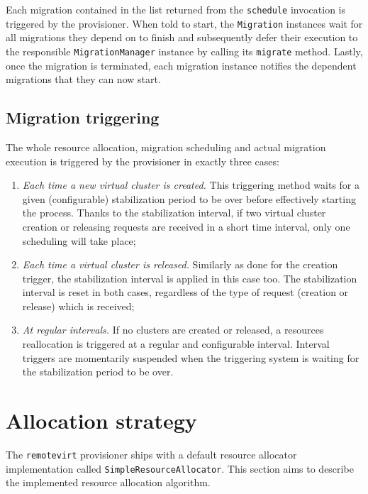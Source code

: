 Each migration contained in the list returned from the \texttt{schedule} invocation is triggered by the provisioner. When told to start, the \texttt{Migration} instances wait for all migrations they depend on to finish and subsequently defer their execution to the responsible \texttt{MigrationManager} instance by calling its \texttt{migrate} method. Lastly, once the migration is terminated, each migration instance notifies the dependent migrations that they can now start.


\subsection{Migration triggering}

The whole resource allocation, migration scheduling and actual migration execution is triggered by the provisioner in exactly three cases:

\begin{enumerate}
	\item \emph{Each time a new virtual cluster is created.} This triggering method waits for a given (configurable) stabilization period to be over before effectively starting the process. Thanks to the stabilization interval, if two virtual cluster creation or releasing requests are received in a short time interval, only one scheduling will take place;
	\item \emph{Each time a virtual cluster is released.} Similarly as done for the creation trigger, the stabilization interval is applied in this case too. The stabilization interval is reset in both cases, regardless of the type of request (creation or release) which is received;
	\item \emph{At regular intervals.} If no clusters are created or released, a resources reallocation is triggered at a regular and configurable interval. Interval triggers are momentarily suspended when the triggering system is waiting for the stabilization period to be over.
\end{enumerate}



\section{Allocation strategy}
\label{sec:allocation-strategy}

The \texttt{remotevirt} provisioner ships with a default resource allocator implementation called \texttt{SimpleResourceAllocator}. This section aims to describe the implemented resource allocation algorithm.

